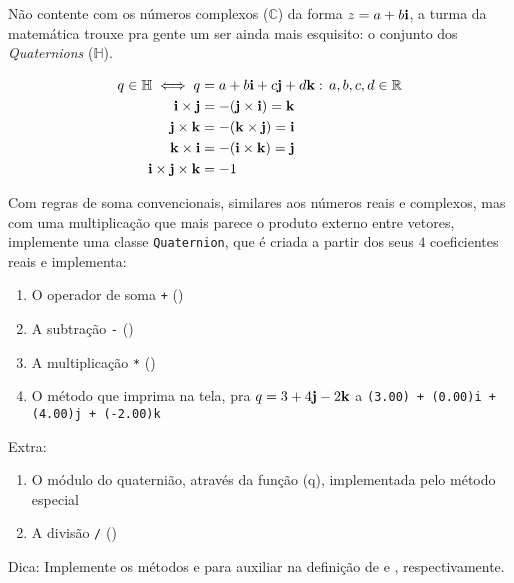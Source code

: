 \documentclass[12pt]{article}
\begin{document}
	
	Não contente com os números complexos ($\mathbb{C}$) da forma $z = a + b\mathbf{i}$, a turma da matemática trouxe pra gente um ser ainda mais esquisito: o conjunto dos \emph{Quaternions} ($\mathbb{H}$).
	
	\begin{align*}
	q \in \mathbb{H} \iff q &= a + b \mathbf{i} + c \mathbf{j} + d \mathbf{k} : \, a,b,c,d \in \mathbb{R}\\
	\mathbf{i} \times \mathbf{j} &= -(\mathbf{j} \times \mathbf{i}) = \mathbf{k}\\
	\mathbf{j} \times \mathbf{k} &= -(\mathbf{k} \times \mathbf{j}) = \mathbf{i}\\
	\mathbf{k} \times \mathbf{i} &= -(\mathbf{i} \times \mathbf{k}) = \mathbf{j}\\
	\mathbf{i} \times \mathbf{j} \times \mathbf{k} &= -1	
	\end{align*}
	
	Com regras de soma convencionais, similares aos números reais e complexos, mas com uma multiplicação que mais parece o produto externo entre vetores, implemente uma classe \texttt{Quaternion}, que é criada a partir dos seus $4$ coeficientes reais e implementa:
	\begin{enumerate}
		\item O operador de soma \texttt{+} ()
		\item A subtração \texttt{-} ()
		\item A multiplicação \texttt{*} ()
		\item O método  que imprima na tela, pra $q = 3 + 4\mathbf{j} - 2\mathbf{k}$ a  \texttt{(3.00) + (0.00)i + (4.00)j + (-2.00)k}
	\end{enumerate}
	
	Extra:
	\begin{enumerate}
		\item O módulo do quaternião, através da função (q), implementada pelo método especial 
		\item A divisão \texttt{\slash} ()
	\end{enumerate}

	Dica:
	Implemente os métodos  e  para auxiliar na definição de  e , respectivamente.
	
	
	
	
	
		
	
\end{document}
